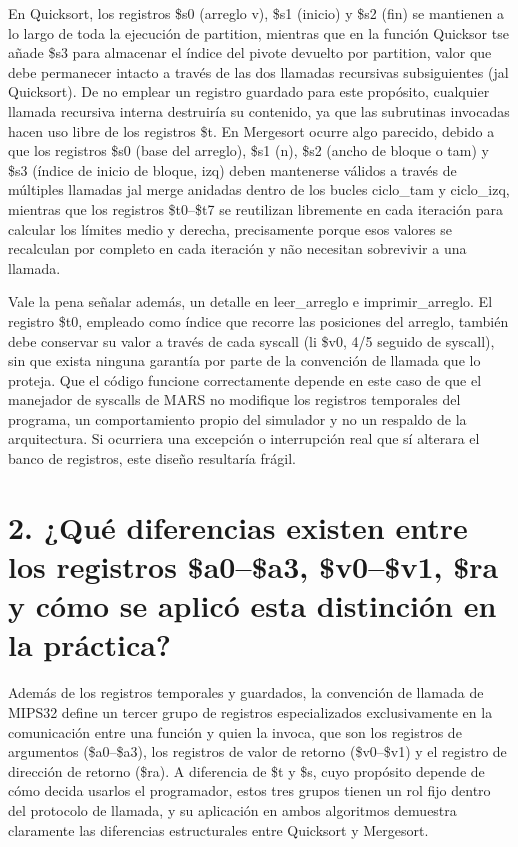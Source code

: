 \documentclass[12pt, letterpaper]{article}
\begin{document}
En Quicksort, los registros \$s0 (arreglo v), \$s1 (inicio) y \$s2 (fin) se mantienen a lo largo de toda la ejecución de partition, mientras que en la función Quicksor tse añade \$s3 para almacenar el índice del pivote devuelto por partition, valor que debe permanecer intacto a través de las dos llamadas recursivas subsiguientes (jal Quicksort). De no emplear un registro guardado para este propósito, cualquier llamada recursiva interna destruiría su contenido, ya que las subrutinas invocadas hacen uso libre de los registros \$t. En Mergesort ocurre algo parecido, debido a que los registros \$s0 (base del arreglo), \$s1 (n), \$s2 (ancho de bloque o tam) y \$s3 (índice de inicio de bloque, izq) deben mantenerse válidos a través de múltiples llamadas jal merge anidadas dentro de los bucles ciclo\_tam y ciclo\_izq, mientras que los registros \$t0–\$t7 se reutilizan libremente en cada iteración para calcular los límites medio y derecha, precisamente porque esos valores se recalculan por completo en cada iteración y não necesitan sobrevivir a una llamada.

Vale la pena señalar además, un detalle en leer\_arreglo e imprimir\_arreglo. El registro \$t0, empleado como índice que recorre las posiciones del arreglo, también debe conservar su valor a través de cada syscall (li \$v0, 4/5 seguido de syscall), sin que exista ninguna garantía por parte de la convención de llamada que lo proteja. Que el código funcione correctamente depende en este caso de que el manejador de syscalls de MARS no modifique los registros temporales del programa, un comportamiento propio del simulador y no un respaldo de la arquitectura. Si ocurriera una excepción o interrupción real que sí alterara el banco de registros, este diseño resultaría frágil.\newpage

\section*{2. ¿Qué diferencias existen entre los registros \$a0–\$a3, \$v0–\$v1, \$ra y cómo se aplicó esta distinción en la práctica?}

Además de los registros temporales y guardados, la convención de llamada de MIPS32 define un tercer grupo de registros especializados exclusivamente en la comunicación entre una función y quien la invoca, que son los registros de argumentos (\$a0–\$a3), los registros de valor de retorno (\$v0–\$v1) y el registro de dirección de retorno (\$ra). A diferencia de \$t y \$s, cuyo propósito depende de cómo decida usarlos el programador, estos tres grupos tienen un rol fijo dentro del protocolo de llamada, y su aplicación en ambos algoritmos demuestra claramente las diferencias estructurales entre Quicksort y Mergesort.
\end{document}
